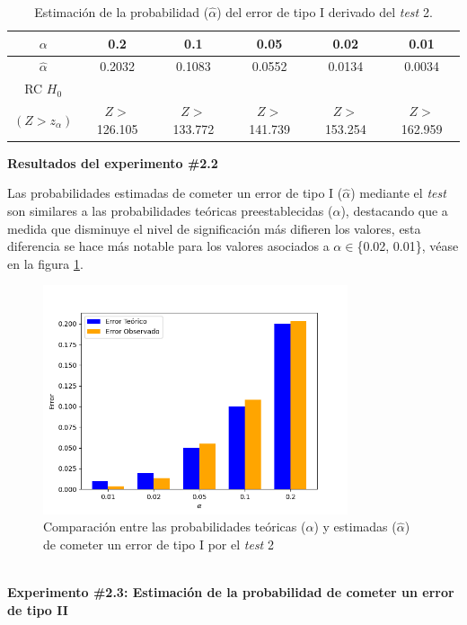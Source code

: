 \documentclass[12pt]{report}
\begin{document}
\begin{table}[h!]
	\centering
	\begin{tabular}{|c|ccccc|}
		\hline
		$\alpha$ &  0.2 & 0.1 & 0.05 & 0.02 &  0.01 \\
		\hline
		$\hat{\alpha}$ & 0.2032 & 0.1083 & 0.0552 & 0.0134 & 0.0034 \\
		\hline
		RC $H_0$  &		&				&			&			&\\
		$(Z>z_\alpha)$&$Z>$126.105& $Z>$133.772& $Z>$141.739& $Z>$153.254& $Z>$162.959 \\
		\hline
	\end{tabular}
	\caption{Estimación de la probabilidad ($\hat{\alpha}$) del error de tipo I derivado del \textit{test} 2.}
	\label{tab:error1-prob1}
\end{table}

\textbf{Resultados del experimento \#2.2}

Las probabilidades estimadas de cometer un error de tipo I ($\hat{\alpha}$) mediante el \textit{test} son similares a las probabilidades teóricas preestablecidas ($\alpha$), destacando que a medida que disminuye el nivel de significación más difieren los valores, esta diferencia se hace más notable para los valores asociados a $\alpha \in$\{0.02, 0.01\}, véase en la figura \ref{Teorico vs Observado1}.
\begin{figure}[ht]
	\centering
	
	\includegraphics[width=0.8\textwidth]{4td_teo_obs.png}
	\caption{Comparación entre las probabilidades teóricas ($\alpha$) y estimadas ($\hat{\alpha}$) de cometer un error de tipo I por el \textit{test} 2}
	\label{Teorico vs Observado1}
\end{figure}\\

\textbf{Experimento \#2.3: Estimación de la probabilidad de cometer un error de tipo II}
\end{document}
